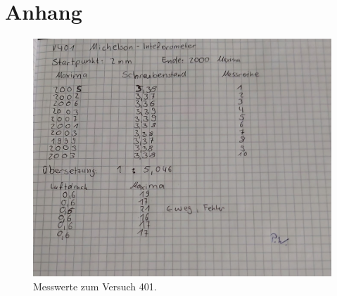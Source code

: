 \section{Anhang}
\label{sec:Anhang}
\begin{figure}[H]
   \centering
    \includegraphics[scale=0.45]{build/KladdeS1.jpeg}
    \caption{Messwerte zum Versuch 401.}
\end{figure}
\pagebreak